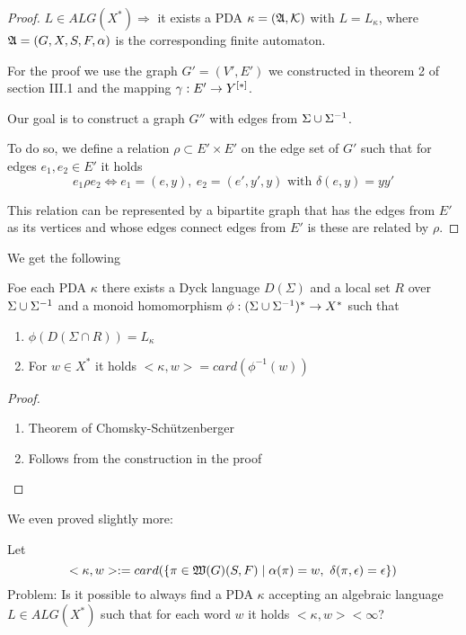 \begin{proof}
$L\in ALG(X^*) \Rightarrow$ it exists a PDA $\kappa=(\mbox{$\mathfrak{A}$},\mbox{$\mathcal{K}$})$ with
$L = L_\kappa$, where $\mbox{$\mathfrak{A}$}=(G, X, S, F, \alpha)$ is the corresponding finite
automaton.

For the proof we use the graph $G'=(V',E')$ we constructed in theorem 2 of
section III.1 and the mapping $\gamma: E' \to \mbox{${Y}^{[*]}$}$.

Our goal is to construct a graph $G''$ with edges from $\Sigma \cup {\Sigma}^{-1}$.

To do so, we define a relation $\rho \subset E'\times E'$ on the edge set of
$G'$ such that for edges $e_1, e_2\in E'$ it holds
\[ e_1 \rho e_2 \iff e_1 = (e, y),\ e_2 = (e', y', y)\text{ with }\delta(e, y) =
yy' \]

This relation can be represented by a bipartite graph that has the edges from
$E'$ as its vertices and whose edges connect edges from $E'$ is these are
related by $\rho$.

\end{proof}

We get the following
\begin{corollary}
Foe each PDA $\kappa$ there exists a Dyck language $D(\Sigma)$ and a local set
$R$ over $\Sigma \cup {\Sigma}^{-1}$ and a monoid homomorphism $\phi:
(\Sigma \cup {\Sigma}^{-1})^* \to X^*$ such that
\begin{enumerate}
  \item $\phi(D(\Sigma\cap R)) = L_\kappa$
  \item For $w\in X^*$ it holds $<\kappa, w> = card(\phi^{-1}(w))$
\end{enumerate}
\end{corollary}

\begin{proof}
\begin{enumerate}
  \item Theorem of Chomsky-Schützenberger
  \item Follows from the construction in the proof
\end{enumerate}
\end{proof}

We even proved slightly more:

Let \[ <\kappa, w> := card(\mbox{$\{\pi\in\mbox{$\mathfrak{W}(G)$}(S,F)\mid
\alpha(\pi)=w,\ \delta(\pi,\epsilon)=\epsilon\}$})
\]
Problem: Is it possible to always find a PDA $\kappa$ accepting an algebraic
language $L \in ALG(X^*)$ such that for each word $w$ it holds $<\kappa, w> <
\infty$?

